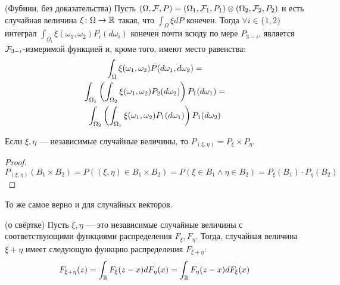 \begin{theorem} (Фубини, без доказательства)
	Пусть $(\Omega, \mathcal{F}, P) = (\Omega_1, \mathcal{F}_1, P_1) \otimes (\Omega_2, \mathcal{F}_2, P_2)$ и есть случайная величина $\xi \colon \Omega \to \mathbb{R}$ такая, что $\int_\Omega \xi dP$ конечен. Тогда $\forall i \in \{1, 2\}$ интеграл $\int_{\Omega_i} \xi(\omega_1, \omega_2) P_i(d\omega_i)$ конечен почти всюду по мере $P_{3 - i}$, является $\mathcal{F}_{3 - i}$-измеримой функцией и, кроме того, имеют место равенства:
	\begin{multline*}
		\int_\Omega \xi(\omega_1, \omega_2) P(d\omega_1, d\omega_2) =
		\\
		\int_{\Omega_1} \left(\int_{\Omega_2} \xi(\omega_1, \omega_2)P_2(d\omega_2)\right) P_1(d\omega_1) =
		\\
		\int_{\Omega_2} \left(\int_{\Omega_1} \xi(\omega_1, \omega_2)P_1(d\omega_1)\right) P_1(d\omega_2)
	\end{multline*}
\end{theorem}

\begin{proposition}
	Если $\xi, \eta$ --- независимые случайные величины, то $P_{(\xi, \eta)} = P_\xi \times P_\eta$.
\end{proposition}

\begin{proof}
	\[
		P_{(\xi, \eta)}(B_1 \times B_2) = P((\xi, \eta) \in B_1 \times B_2) = P(\xi \in B_1 \wedge \eta \in B_2) = P_\xi(B_1) \cdot P_\eta(B_2)
	\]
\end{proof}

\begin{note}
	То же самое верно и для случайных векторов.
\end{note}

\begin{lemma} (о свёртке)
	Пусть $\xi, \eta$ --- это независимые случайные величины с соответствующими функциями распределения $F_\xi, F_\eta$. Тогда, случайная величина $\xi + \eta$ имеет следующую функцию распределения $F_{\xi + \eta}$:
	\[
		F_{\xi + \eta}(z) = \int_{\mathbb{R}} F_\xi(z - x)dF_\eta(x) = \int_{\mathbb{R}} F_\eta(z - x)dF_\xi(x)
	\]
\end{lemma}

